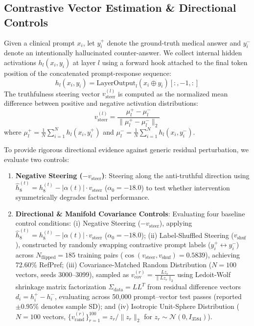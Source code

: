 \documentclass[conference]{IEEEtran}
\begin{document}
\subsection{Contrastive Vector Estimation \& Directional Controls}
Given a clinical prompt $x_i$, let $y_i^+$ denote the ground-truth medical answer and $y_i^-$ denote an intentionally hallucinated counter-answer. We collect internal hidden activations $h_l(x_i, y_i)$ at layer $l$ using a forward hook attached to the final token position of the concatenated prompt-response sequence:
\begin{equation}
h_l(x_i, y_i) = \text{LayerOutput}_l(x_i \oplus y_i)[:, -1, :]
\end{equation}
The truthfulness steering vector $v_{\text{steer}}^{(l)}$ is computed as the normalized mean difference between positive and negative activation distributions:
\begin{equation}
v_{\text{steer}}^{(l)} = \frac{\mu_l^+ - \mu_l^-}{\|\mu_l^+ - \mu_l^-\|_2}
\end{equation}
where $\mu_l^+ = \frac{1}{N} \sum_{i=1}^N h_l(x_i, y_i^+)$ and $\mu_l^- = \frac{1}{N} \sum_{i=1}^N h_l(x_i, y_i^-)$.

To provide rigorous directional evidence against generic residual perturbation, we evaluate two controls:
\begin{enumerate}
    \item \textbf{Negative Steering ($-v_{\text{steer}}$)}: Steering along the anti-truthful direction using $\hat{h}_8^{(t)} = h_8^{(t)} - |\alpha(t)| \cdot v_{\text{steer}}$ ($\alpha_0=-18.0$) to test whether intervention symmetrically degrades factual performance.
    \item \textbf{Directional \& Manifold Covariance Controls}: Evaluating four baseline control conditions: (i) Negative Steering ($-v_{\text{steer}}$), applying $\hat{h}_8^{(t)} = h_8^{(t)} - |\alpha(t)| \cdot v_{\text{steer}}$ ($\alpha_0=-18.0$); (ii) Label-Shuffled Steering ($v_{\text{shuf}}$), constructed by randomly swapping contrastive prompt labels ($y_i^+ \leftrightarrow y_i^-$) across $N_{\text{flipped}}=185$ training pairs ($\cos(v_{\text{steer}}, v_{\text{shuf}})=0.5839$), achieving 72.60\% RefPref; (iii) Covariance-Matched Random Distribution ($N=100$ vectors, seeds 3000--3099), sampled as $v_{\text{cov}}^{(r)} = \frac{L z_r}{\|L z_r\|_2}$ using Ledoit-Wolf shrinkage matrix factorization $\Sigma_{\text{data}} = L L^T$ from residual difference vectors $d_i = h_i^+ - h_i^-$, evaluating across 50,000 prompt--vector test passes (reported $\pm0.95\%$ denotes sample SD); and (iv) Isotropic Unit-Sphere Distribution ($N=100$ vectors, $\{v_{\text{rand}}^{(r)}\}_{r=1}^{100} = z_r / \|z_r\|_2$ for $z_r \sim \mathcal{N}(0, I_{3584})$).
\end{enumerate}
\end{document}
